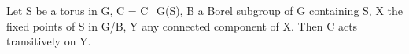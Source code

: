 Let S be a torus in G, C = C_G(S), B a Borel subgroup of G containing S, X the fixed points of S in G/B, Y any connected component of X. Then C acts transitively on Y.
